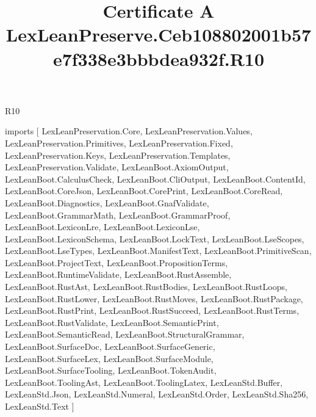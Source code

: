 \begin{lexlean}{R10}
\title{Certificate A LexLeanPreserve.Ceb108802001b57e7f338e3bbbdea932f.R10}
\begin{coremodule}
imports [
  LexLeanPreservation.Core,
  LexLeanPreservation.Values,
  LexLeanPreservation.Primitives,
  LexLeanPreservation.Fixed,
  LexLeanPreservation.Keys,
  LexLeanPreservation.Templates,
  LexLeanPreservation.Validate,
  LexLeanBoot.AxiomOutput,
  LexLeanBoot.CalculusCheck,
  LexLeanBoot.CliOutput,
  LexLeanBoot.ContentId,
  LexLeanBoot.CoreJson,
  LexLeanBoot.CorePrint,
  LexLeanBoot.CoreRead,
  LexLeanBoot.Diagnostics,
  LexLeanBoot.GnafValidate,
  LexLeanBoot.GrammarMath,
  LexLeanBoot.GrammarProof,
  LexLeanBoot.LexiconLre,
  LexLeanBoot.LexiconLse,
  LexLeanBoot.LexiconSchema,
  LexLeanBoot.LockText,
  LexLeanBoot.LseScopes,
  LexLeanBoot.LseTypes,
  LexLeanBoot.ManifestText,
  LexLeanBoot.PrimitiveScan,
  LexLeanBoot.ProjectText,
  LexLeanBoot.PropositionTerms,
  LexLeanBoot.RuntimeValidate,
  LexLeanBoot.RustAssemble,
  LexLeanBoot.RustAst,
  LexLeanBoot.RustBodies,
  LexLeanBoot.RustLoops,
  LexLeanBoot.RustLower,
  LexLeanBoot.RustMoves,
  LexLeanBoot.RustPackage,
  LexLeanBoot.RustPrint,
  LexLeanBoot.RustSucceed,
  LexLeanBoot.RustTerms,
  LexLeanBoot.RustValidate,
  LexLeanBoot.SemanticPrint,
  LexLeanBoot.SemanticRead,
  LexLeanBoot.StructuralGrammar,
  LexLeanBoot.SurfaceDoc,
  LexLeanBoot.SurfaceGeneric,
  LexLeanBoot.SurfaceLex,
  LexLeanBoot.SurfaceModule,
  LexLeanBoot.SurfaceTooling,
  LexLeanBoot.TokenAudit,
  LexLeanBoot.ToolingAst,
  LexLeanBoot.ToolingLatex,
  LexLeanStd.Buffer,
  LexLeanStd.Json,
  LexLeanStd.Numeral,
  LexLeanStd.Order,
  LexLeanStd.Sha256,
  LexLeanStd.Text
]


\end{coremodule}
\end{lexlean}
